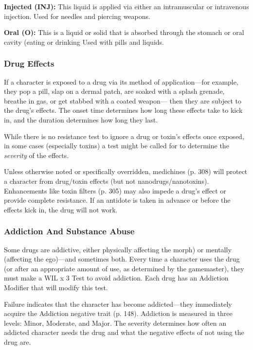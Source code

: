 \textbf{Injected (INJ): }This liquid is applied via either 
an intramuscular or intravenous injection. Used for 
needles and piercing weapons.

\textbf{Oral (O):} This is a liquid or solid that is absorbed 
through the stomach or oral cavity (eating or drinking
Used with pills and liquids.

\subsubsection{Drug Effects}

If a character is exposed to a drug via its method of 
application—for example, they pop a pill, slap on 
a dermal patch, are soaked with a splash grenade, 
breathe in gas, or get stabbed with a coated weapon—
then they are subject to the drug's effects. The onset 
time determines how long these effects take to kick in, 
and the duration determines how long they last.

While there is no resistance test to ignore a drug or 
toxin's effects once exposed, in some cases (especially 
toxins) a test might be called for to determine the 
\textit{severity} of the effects. 

Unless otherwise noted or specifically overridden, 
medichines (p. 308) will protect a character from 
drug/toxin effects (but not nanodrugs/nanotoxins). 
Enhancements like toxin filters (p. 305) may also 
impede a drug's effect or provide complete resistance. 
If an antidote is taken in advance or before the effects 
kick in, the drug will not work.

\subsubsection{Addiction And Substance Abuse}

Some drugs are addictive, either physically affecting
the morph) or mentally (affecting the ego)—and
sometimes both. Every time a character uses the drug 
(or after an appropriate amount of use, as determined 
by the gamemaster), they must make a WIL x 3 Test to 
avoid addiction. Each drug has an Addiction Modifier 
that will modify this test.

Failure indicates that the character has become 
addicted—they immediately acquire the Addiction 
negative trait (p. 148). Addiction is measured in three 
levels: Minor, Moderate, and Major. The severity determines
how often an addicted character needs the
drug and what the negative effects of not using the 
drug are.

